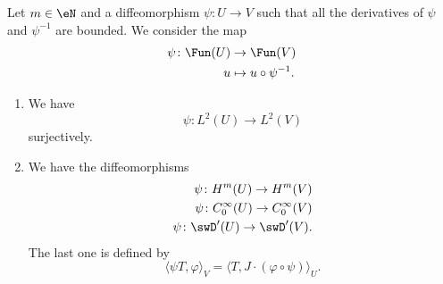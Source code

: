 \begin{proposition}
    Let \( m\in \eN\) and a diffeomorphism \( \psi\colon U\to V\) such that all the derivatives of \( \psi\) and \( \psi^{-1}\) are bounded. We consider the map
    \begin{equation}
        \begin{aligned}
            \psi\colon \Fun(U)&\to \Fun(V) \\
            u&\mapsto u\circ\psi^{-1}.
        \end{aligned}
    \end{equation}
    \begin{enumerate}
        \item       \label{ITEMooNJZOooOrzQIT}
            We have
            \begin{equation}
                \psi\colon L^2(U)\to L^2(V)
            \end{equation}
            surjectively.
        \item        
    We have the diffeomorphisms
    \begin{subequations}
        \begin{align}
            \psi\colon H^m(U)\to H^m(V)\\
            \psi\colon  C^{\infty}_0(U)\to  C^{\infty}_0(V)\\
            \psi\colon \swD'(U)\to \swD'(V).
        \end{align}
    \end{subequations}
    The last one is defined by 
    \begin{equation}
        \langle \psi T, \varphi\rangle_V=\langle T, J\cdot(\varphi\circ\psi)\rangle_U.
    \end{equation}
    \end{enumerate}
\end{proposition}

